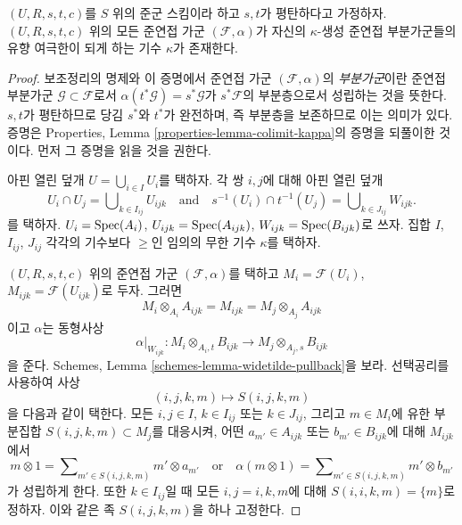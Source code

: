 \begin{lemma}
\label{lemma-colimit-kappa}
$(U, R, s, t, c)$를 $S$ 위의 준군 스킴이라 하고 $s, t$가 평탄하다고 가정하자. $(U, R, s, t, c)$ 위의 모든 준연접 가군
$(\mathcal{F}, \alpha)$가 자신의 $\kappa$-생성 준연접 부분가군들의 유향 여극한이 되게 하는 기수 $\kappa$가 존재한다.
\end{lemma}

\begin{proof}
보조정리의 명제와 이 증명에서 준연접 가군 $(\mathcal{F}, \alpha)$의 {\it 부분가군}이란 준연접 부분가군
$\mathcal{G} \subset \mathcal{F}$로서 $\alpha(t^*\mathcal{G}) = s^*\mathcal{G}$가 $s^*\mathcal{F}$의
부분층으로서 성립하는 것을 뜻한다. $s, t$가 평탄하므로 당김 $s^*$와 $t^*$가 완전하며, 즉 부분층을 보존하므로 이는 의미가 있다.
증명은 Properties, Lemma \ref{properties-lemma-colimit-kappa}의 증명을 되풀이한 것이다. 먼저 그 증명을 읽을 것을 권한다.

\medskip\noindent
아핀 열린 덮개 $U = \bigcup_{i \in I} U_i$를 택하자. 각 쌍 $i, j$에 대해 아핀 열린 덮개
$$
U_i \cap U_j = \bigcup\nolimits_{k \in I_{ij}} U_{ijk}
\quad\text{and}\quad
s^{-1}(U_i) \cap t^{-1}(U_j) = \bigcup\nolimits_{k \in J_{ij}} W_{ijk}.
$$
를 택하자. $U_i = \mathop{\mathrm{Spec}}(A_i)$, $U_{ijk} = \mathop{\mathrm{Spec}}(A_{ijk})$, $W_{ijk} = \mathop{\mathrm{Spec}}(B_{ijk})$로 쓰자.
집합 $I$, $I_{ij}$, $J_{ij}$ 각각의 기수보다 $\geq$인 임의의 무한 기수 $\kappa$를 택하자.

\medskip\noindent
$(U, R, s, t, c)$ 위의 준연접 가군 $(\mathcal{F}, \alpha)$를 택하고
$M_i = \mathcal{F}(U_i)$, $M_{ijk} = \mathcal{F}(U_{ijk})$로 두자. 그러면
$$
M_i \otimes_{A_i} A_{ijk} = M_{ijk} = M_j \otimes_{A_j} A_{ijk}
$$
이고 $\alpha$는 동형사상
$$
\alpha|_{W_{ijk}} :
M_i \otimes_{A_i, t} B_{ijk}
\longrightarrow
M_j \otimes_{A_j, s} B_{ijk}
$$
을 준다. Schemes, Lemma \ref{schemes-lemma-widetilde-pullback}을 보라. 선택공리를 사용하여 사상
$$
(i, j, k, m) \mapsto S(i, j, k, m)
$$
을 다음과 같이 택한다. 모든 $i, j \in I$, $k \in I_{ij}$ 또는 $k \in J_{ij}$, 그리고 $m \in M_i$에
유한 부분집합 $S(i, j, k, m) \subset M_j$를 대응시켜, 어떤 $a_{m'} \in A_{ijk}$ 또는
$b_{m'} \in B_{ijk}$에 대해 $M_{ijk}$에서
$$
m \otimes 1 = \sum\nolimits_{m' \in S(i, j, k, m)} m' \otimes a_{m'}
\quad\text{or}\quad
\alpha(m \otimes 1) = \sum\nolimits_{m' \in S(i, j, k, m)} m' \otimes b_{m'}
$$
가 성립하게 한다. 또한 $k \in I_{ij}$일 때 모든 $i, j = i, k, m$에 대해
$S(i, i, k, m) = \{m\}$로 정하자. 이와 같은 족 $S(i, j, k, m)$을 하나 고정한다.


\end{proof}
